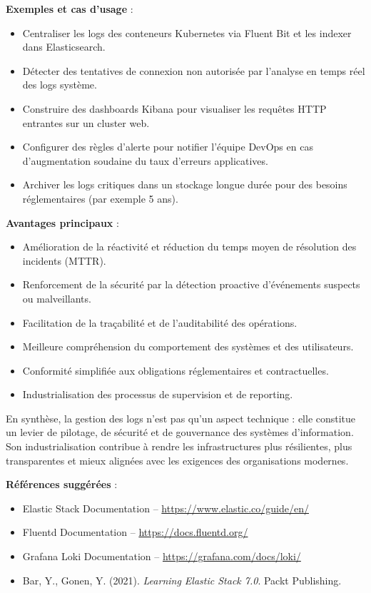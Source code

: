 \textbf{Exemples et cas d’usage} :
\begin{itemize}
	\item Centraliser les logs des conteneurs Kubernetes via Fluent Bit et les indexer dans Elasticsearch.
	\item Détecter des tentatives de connexion non autorisée par l’analyse en temps réel des logs système.
	\item Construire des dashboards Kibana pour visualiser les requêtes HTTP entrantes sur un cluster web.
	\item Configurer des règles d’alerte pour notifier l’équipe DevOps en cas d’augmentation soudaine du taux d’erreurs applicatives.
	\item Archiver les logs critiques dans un stockage longue durée pour des besoins réglementaires (par exemple 5 ans).
\end{itemize}

\textbf{Avantages principaux} :
\begin{itemize}
	\item Amélioration de la réactivité et réduction du temps moyen de résolution des incidents (MTTR).
	\item Renforcement de la sécurité par la détection proactive d’événements suspects ou malveillants.
	\item Facilitation de la traçabilité et de l’auditabilité des opérations.
	\item Meilleure compréhension du comportement des systèmes et des utilisateurs.
	\item Conformité simplifiée aux obligations réglementaires et contractuelles.
	\item Industrialisation des processus de supervision et de reporting.
\end{itemize}

En synthèse, la gestion des logs n’est pas qu’un aspect technique  : elle constitue un levier de pilotage, de sécurité et de gouvernance des systèmes d’information. Son industrialisation contribue à rendre les infrastructures plus résilientes, plus transparentes et mieux alignées avec les exigences des organisations modernes.

\textbf{Références suggérées} :
\begin{itemize}
	\item Elastic Stack Documentation – \url{https://www.elastic.co/guide/en/}
	\item Fluentd Documentation – \url{https://docs.fluentd.org/}
	\item Grafana Loki Documentation – \url{https://grafana.com/docs/loki/}
	\item Bar, Y., Gonen, Y. (2021). \textit{Learning Elastic Stack 7.0}. Packt Publishing.
\end{itemize}

